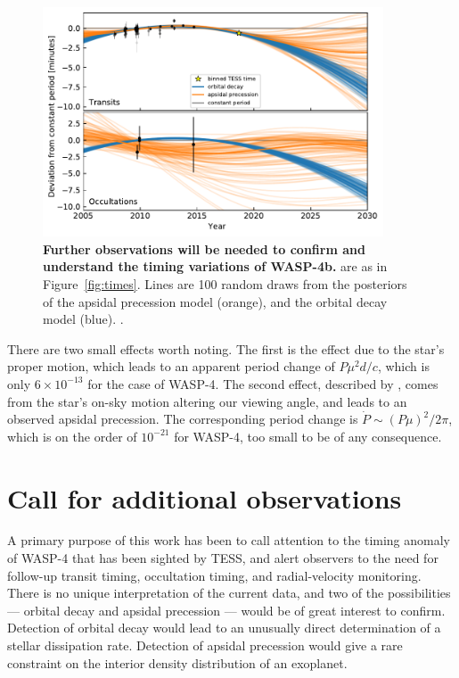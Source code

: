 \documentclass[12pt,twocolumn,tighten]{aastex62}
\begin{document}
{\begin{figure}[t]
	\begin{center}
		\leavevmode
		\includegraphics[width=0.9\textwidth]{f7.pdf}
	\end{center}
	\vspace{-0.7cm}
	\caption{
    {\bf Further observations will be needed to confirm and understand
    the timing variations of WASP-4b.}  are as
    in Figure~\ref{fig:times}.  Lines are 100 random draws from the
    posteriors of the apsidal precession model (orange), and the
    orbital decay model (blue).  .    
		\label{fig:future}
	}
\end{figure}

There are two  small effects worth noting.  The
first is the \citet{shklovskii_possible_1970} effect due to the star's
proper motion, which leads to an apparent period change of $P\mu^2 d/
c$, which is only $6\times10^{-13}$ for the case of WASP-4.  The
second effect, described by \citet{rafikov_stellar_2009}, comes from
the star's on-sky motion altering our viewing angle, and leads to an
observed apsidal precession. The corresponding period change is
$\dot{P} \sim (P\mu)^2/2\pi$, which is on the order of $10^{-21}$ for
WASP-4, too small to be of any consequence.


\section{Call for additional observations}
\label{sec:future}

A primary purpose of this work has been to call attention to the
timing anomaly of WASP-4 that has been sighted by TESS, and alert
observers to the need for follow-up transit timing, occultation
timing, and radial-velocity monitoring.  There is no unique
interpretation of the current data, and two of the possibilities ---
orbital decay and apsidal precession --- would be of great interest to
confirm. Detection of orbital decay would lead to an unusually direct
determination of a stellar dissipation rate. Detection of apsidal
precession would give a rare constraint on the interior density
distribution of an exoplanet.

}
\end{document}
